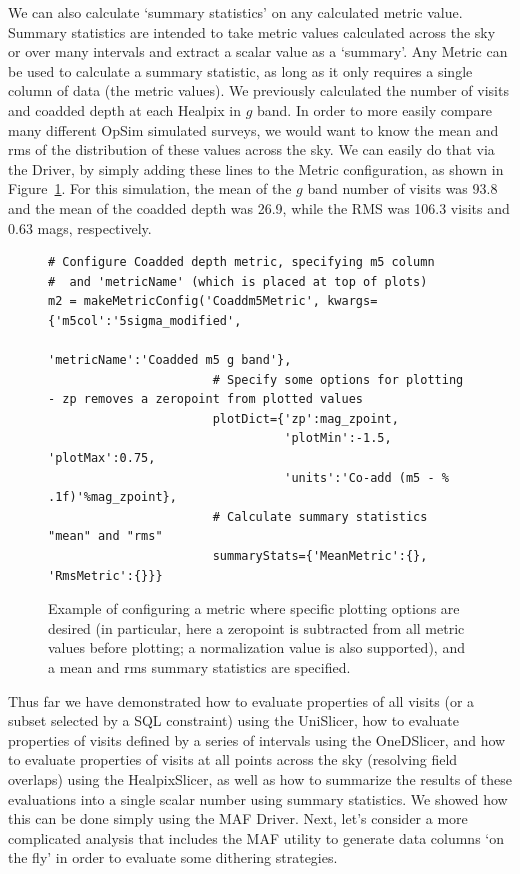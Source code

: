 \documentclass[]{spie}  %
\begin{document}
We can also calculate `summary statistics' on any calculated metric
value. Summary statistics are intended to take metric values
calculated across the sky or over many intervals and extract a scalar
value as a `summary'. Any Metric can be used to calculate a summary
statistic, as long as it only requires a single column of data (the
metric values).  We previously calculated the number of visits
and coadded depth at each Healpix in $g$ band. In order to more easily compare
many different OpSim simulated surveys, we would want to know the mean and
rms of the distribution of these values across the sky. We can easily
do that via the Driver, by simply adding these lines to the Metric
configuration, as shown in Figure~\ref{fig:coaddm5metric}. For this
simulation, the mean of the $g$ band number of visits was 93.8 and the
mean of the coadded depth was 26.9, while the RMS was 106.3 visits and 0.63
mags, respectively.

\begin{figure}
\centering
\begin{lstlisting}[frame=single]
# Configure Coadded depth metric, specifying m5 column 
#  and 'metricName' (which is placed at top of plots)
m2 = makeMetricConfig('Coaddm5Metric', kwargs={'m5col':'5sigma_modified',
                                               'metricName':'Coadded m5 g band'},
                       # Specify some options for plotting - zp removes a zeropoint from plotted values
                       plotDict={'zp':mag_zpoint,
                                 'plotMin':-1.5, 'plotMax':0.75,
                                 'units':'Co-add (m5 - % .1f)'%mag_zpoint},
                       # Calculate summary statistics "mean" and "rms" 
                       summaryStats={'MeanMetric':{}, 'RmsMetric':{}}}
\end{lstlisting}
\caption[]
{\label{fig:coaddm5metric}Example of configuring a metric where
  specific plotting options are desired (in particular, here a
  zeropoint is subtracted from all metric values before plotting; a
  normalization value is also supported), and a mean and rms summary
  statistics are specified.}
\end{figure}

Thus far we have demonstrated how to evaluate properties of all visits
(or a subset selected by a SQL constraint) using the UniSlicer, how to
evaluate properties of visits defined by a series of intervals using
the OneDSlicer, and how to evaluate properties of visits at all points
across the sky (resolving field overlaps) using the HealpixSlicer, as
well as how to summarize the results of these evaluations into a
single scalar number using summary statistics. We showed how this can
be done simply using the MAF Driver. Next, let's consider a more
complicated analysis that includes the MAF utility to generate data
columns `on the fly' in order to evaluate some dithering strategies.
\end{document}
